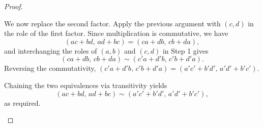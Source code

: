 \begin{proof}
\begin{enumerate}
    We now replace the second factor. Apply the previous argument with $(c,d)$ in the role of the first factor. Since multiplication is commutative, we have
    $$(ac + bd,\, ad + bc) = (ca + db,\, cb + da),$$
    and interchanging the roles of $(a,b)$ and $(c,d)$ in Step 1 gives
    $$(ca + db,\, cb + da) \sim (c'a + d'b,\, c'b + d'a).$$
    Reversing the commutativity, $(c'a + d'b,\, c'b + d'a) = (a'c' + b'd',\, a'd' + b'c')$.

    Chaining the two equivalences via transitivity yields
    $$(ac + bd,\, ad + bc) \sim (a'c' + b'd',\, a'd' + b'c'),$$
    as required.
\end{enumerate}
\end{proof}
